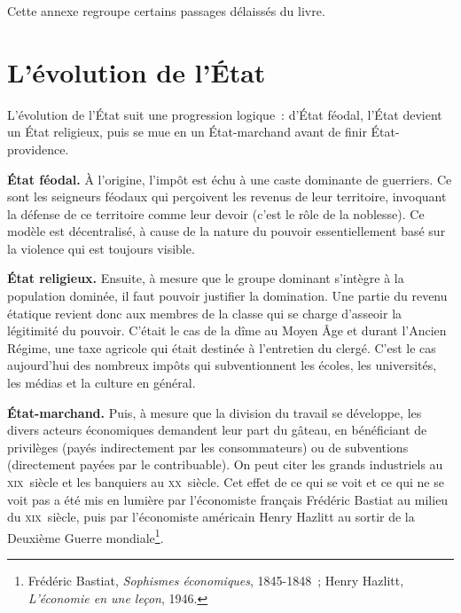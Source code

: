 
\maketitle

Cette annexe regroupe certains passages délaissés du livre.

\section{L'évolution de l'État}


L'évolution de l'État suit une progression logique~: d'État féodal, l'État devient un État religieux, puis se mue en un État-marchand avant de finir État-providence.

\textbf{État féodal.} À l'origine, l'impôt est échu à une caste dominante de guerriers. Ce sont les seigneurs féodaux qui perçoivent les revenus de leur territoire, invoquant la défense de ce territoire comme leur devoir (c'est le rôle de la noblesse). Ce modèle est décentralisé, à cause de la nature du pouvoir essentiellement basé sur la violence qui est toujours visible.

\textbf{État religieux.} Ensuite, à mesure que le groupe dominant s'intègre à la population dominée, il faut pouvoir justifier la domination. Une partie du revenu étatique revient donc aux membres de la classe qui se charge d'asseoir la légitimité du pouvoir. C'était le cas de la dîme au Moyen Âge et durant l'Ancien Régime, une taxe agricole qui était destinée à l'entretien du clergé. C'est le cas aujourd'hui des nombreux impôts qui subventionnent les écoles, les universités, les médias et la culture en général.

\textbf{État-marchand.} Puis, à mesure que la division du travail se développe, les divers acteurs économiques demandent leur part du gâteau, en bénéficiant de privilèges (payés indirectement par les consommateurs) ou de subventions (directement payées par le contribuable). On peut citer les grands industriels au \textsc{xix}\ieme{}~siècle et les banquiers au \textsc{xx}\ieme{}~siècle. Cet effet de ce qui se voit et ce qui ne se voit pas a été mis en lumière par l'économiste français Frédéric Bastiat au milieu du \textsc{xix}\ieme{}~siècle, puis par l'économiste américain Henry Hazlitt au sortir de la Deuxième Guerre mondiale\footnote{Frédéric Bastiat, \emph{Sophismes économiques}, 1845-1848~; Henry Hazlitt, \emph{L'économie en une leçon}, 1946.}.

